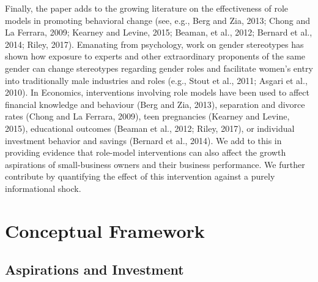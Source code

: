 \documentclass[11.5pt]{article}
\begin{document}
Finally, the paper adds to the growing literature on the effectiveness of role models in promoting behavioral change (see, e.g., Berg and Zia, 2013; Chong and La Ferrara, 2009; Kearney and Levine, 2015; Beaman, et al., 2012; Bernard et al., 2014; Riley, 2017). Emanating from psychology, work on gender stereotypes has shown how exposure to experts and other extraordinary proponents of the same gender  can change stereotypes regarding gender roles and facilitate women's entry into traditionally male industries and roles (e.g., Stout et al., 2011; Asgari et al., 2010). In Economics, interventions involving role models have been used to affect financial knowledge and behaviour (Berg and Zia, 2013), separation and divorce rates (Chong and La Ferrara, 2009), teen pregnancies (Kearney and Levine, 2015), educational outcomes (Beaman et al., 2012; Riley, 2017), or individual investment behavior and savings (Bernard et al., 2014). We add to this in providing evidence that role-model interventions can also affect the growth aspirations of small-business owners and their business performance. We further contribute by quantifying the effect of this intervention against a purely informational shock.


\section{Conceptual Framework} \label{sec:hypotheses}

\subsection{Aspirations and Investment}
\end{document}
